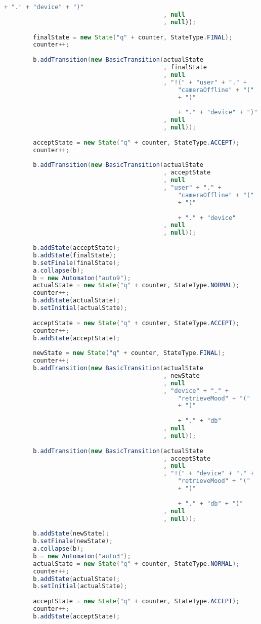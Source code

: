 \begin{lstlisting}[language=java, caption={\textit{Specification} osztály.},captionpos=b,label=specification_class]
												+ "." + "device" + ")"
											, null
											, null));
		
		finalState = new State("q" + counter, StateType.FINAL);
		counter++;
		
		b.addTransition(new BasicTransition(actualState
											, finalState
											, null
											, "!(" + "user" + "." +	
												"cameraOffline" + "("
												+ ")"
												
												+ "." + "device" + ")"
											, null
											, null));
		
		acceptState = new State("q" + counter, StateType.ACCEPT);
		counter++;
		
		b.addTransition(new BasicTransition(actualState
											, acceptState
											, null
											, "user" + "." +	
												"cameraOffline" + "("
												+ ")"
												
												+ "." + "device"
											, null
											, null));
		
		b.addState(acceptState);
		b.addState(finalState);
		b.setFinale(finalState);
		a.collapse(b);
		b = new Automaton("auto9");
		actualState = new State("q" + counter, StateType.NORMAL);
		counter++;
		b.addState(actualState);
		b.setInitial(actualState);
		
		acceptState = new State("q" + counter, StateType.ACCEPT);
		counter++;
		b.addState(acceptState);
		
		newState = new State("q" + counter, StateType.FINAL);
		counter++;
		b.addTransition(new BasicTransition(actualState
											, newState
											, null
											, "device" + "." +	
												"retrieveMood" + "("
												+ ")"
												
												+ "." + "db"
											, null
											, null));
											
		b.addTransition(new BasicTransition(actualState
											, acceptState
											, null
											, "!(" + "device" + "." +	
												"retrieveMood" + "("
												+ ")"
												
												+ "." + "db" + ")"
											, null
											, null));
										
		b.addState(newState);
		b.setFinale(newState);
		a.collapse(b);
		b = new Automaton("auto3");
		actualState = new State("q" + counter, StateType.NORMAL);
		counter++;
		b.addState(actualState);
		b.setInitial(actualState);
		
		acceptState = new State("q" + counter, StateType.ACCEPT);
		counter++;
		b.addState(acceptState);
		

\end{lstlisting}
